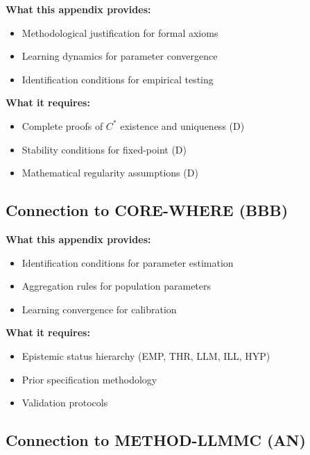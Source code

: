 \begin{tcolorbox}[colback=yellow!5!white, colframe=yellow!75!black,
    title=Integration: METHOD-CONSTRUCT $\leftrightarrow$ FORMAL-PROOF (D)]
\textbf{What this appendix provides:}
\begin{itemize}[nosep]
\item Methodological justification for formal axioms
\item Learning dynamics for parameter convergence
\item Identification conditions for empirical testing
\end{itemize}

\textbf{What it requires:}
\begin{itemize}[nosep]
\item Complete proofs of $C^*$ existence and uniqueness (D)
\item Stability conditions for fixed-point (D)
\item Mathematical regularity assumptions (D)
\end{itemize}
\end{tcolorbox}

\subsection{Connection to CORE-WHERE (BBB)}

\begin{tcolorbox}[colback=yellow!5!white, colframe=yellow!75!black,
    title=Integration: METHOD-CONSTRUCT $\leftrightarrow$ CORE-WHERE (BBB)]
\textbf{What this appendix provides:}
\begin{itemize}[nosep]
\item Identification conditions for parameter estimation
\item Aggregation rules for population parameters
\item Learning convergence for calibration
\end{itemize}

\textbf{What it requires:}
\begin{itemize}[nosep]
\item Epistemic status hierarchy (EMP, THR, LLM, ILL, HYP)
\item Prior specification methodology
\item Validation protocols
\end{itemize}
\end{tcolorbox}

\subsection{Connection to METHOD-LLMMC (AN)}

